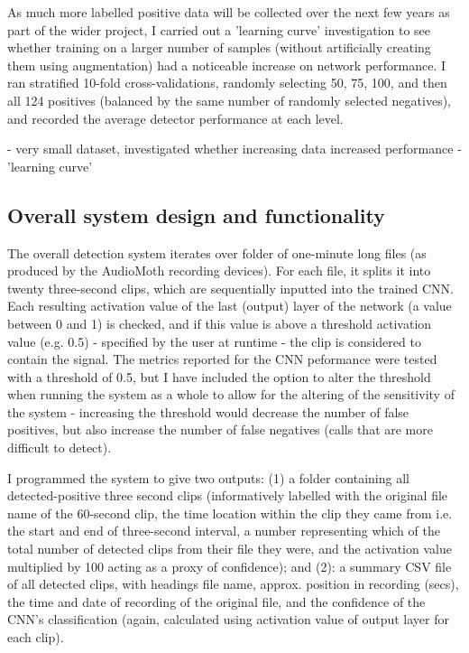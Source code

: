 \documentclass[11pt]{article}
\begin{document}
As much more labelled positive data will be collected over the next few years as part of the wider project, I carried out a 'learning curve' investigation to see whether training on a larger number of samples (without artificially creating them using augmentation) had a noticeable increase on network performance. I ran stratified 10-fold cross-validations, randomly selecting 50, 75, 100, and then all 124 positives (balanced by the same number of randomly selected negatives), and recorded the average detector performance at each level.  

- very small dataset, investigated whether increasing data increased performance
- 'learning curve'
 
\subsection{Overall system design and functionality}

The overall detection system iterates over folder of one-minute long files (as produced by the AudioMoth recording devices). For each file, it splits it into twenty three-second clips, which are sequentially inputted into the trained CNN. Each resulting activation value of the last (output) layer of the network (a value between 0 and 1) is checked, and if this value is above a threshold activation value (e.g. 0.5) - specified by the user at runtime - the clip is considered to contain the signal. The metrics reported for the CNN peformance were tested with a threshold of 0.5, but I have included the option to alter the threshold when running the system as a whole to allow for the altering of the sensitivity of the system - increasing the threshold would decrease the number of false positives, but also increase the number of false negatives (calls that are more difficult to detect).

I programmed the system to give two outputs: (1) a folder containing all detected-positive three second clips (informatively labelled with the original file name of the 60-second clip, the time location within the clip they came from i.e. the start and end of three-second interval, a number representing which of the total number of detected clips from their file they were, and the activation value multiplied by 100 acting as a proxy of confidence); and (2): a summary CSV file of all detected clips, with headings file name, approx. position in recording (secs), the time and date of recording of the original file, and the confidence of the CNN's classification (again, calculated using activation value of output layer for each clip). 
\end{document}
